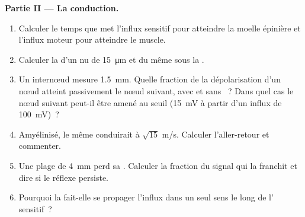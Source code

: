 \begin{problem}
\medskip
\noindent\textbf{Partie II --- La conduction.}
\begin{enumerate}[resume]
  \item Calculer le temps que met l'influx sensitif pour atteindre la
        moelle épinière et l'influx moteur pour atteindre le muscle.
  \item Calculer la  d'un  nu de \qty{15}{\micro m}
        et du même  sous la .
  \item Un internœud mesure \qty{1.5}{mm}. Quelle fraction de la
        dépolarisation d'un nœud atteint passivement le nœud suivant, avec
        et sans ~? Dans quel cas le nœud suivant peut-il être amené
        au seuil (\qty{15}{mV} à partir d'un influx de \qty{100}{mV})~?
  \item Amyélinisé, le même  conduirait à $\sqrt{15}$
        m/s. Calculer l'aller-retour et commenter.
  \item Une plage de \qty{4}{mm} perd sa . Calculer la
        fraction du signal qui la franchit et dire si le réflexe
        persiste.
  \item Pourquoi la  fait-elle se propager l'influx
        dans un seul sens le long de l' sensitif~?
\end{enumerate}


\end{problem}
